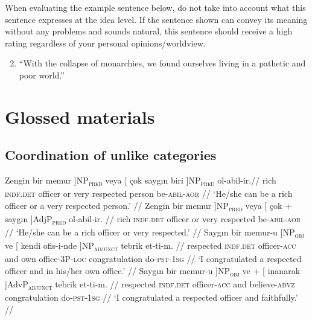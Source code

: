 When evaluating the example sentence below, do not take into account what this sentence expresses at the idea level. If the sentence shown can convey its meaning without any problems and sounds natural, this sentence should receive a high rating regardless of your personal opinions/worldview.

\begin{enumerate}
	\setcounter{enumi}{1}
	\item ``With the collapse of monarchies, we found ourselves living in a pathetic and poor world.''
\end{enumerate}


\section{Glossed materials}
\subsection{Coordination of unlike categories}

\pex[exno=TS1, glspace=!1em,everygla={},everyglb={},aboveglbskip=-.15ex, interpartskip=15pt]
\label{TS1} 
\a
\begingl
\gla {[} Zengin bir {memur }]NP\textsubscript{\textsc{pred}} veya {[} çok saygın {biri }]NP\textsubscript{\textsc{pred}} ol-abil-ir.//
\glb rich \textsc{indf.det} officer or very respected person be-\textsc{abil}-\textsc{aor} //
\glft `He/she can be a rich officer or a very respected person.' //
\endgl
\a
\begingl
\gla {[} Zengin bir {memur }]NP\textsubscript{\textsc{pred}} veya {[} çok + {saygın }]AdjP\textsubscript{\textsc{pred}} ol-abil-ir.  //
\glb rich \textsc{indf.det} officer or very respected be-\textsc{abil}-\textsc{aor} //
\glft `He/she can be a rich officer or very respected.' //
\endgl
\a
\begingl
\gla {[} Saygın bir {memur-u }]NP\textsubscript{\textsc{obj}} ve {[} kendi {ofis-i-nde }]NP\textsubscript{\textsc{adjunct}} tebrik et-ti-m.  //
\glb respected \textsc{indf.det} officer-\textsc{acc} and own office-\textsc{3P}-\textsc{loc} congratulation do-\textsc{pst}-\textsc{1sg} //
\glft `I congratulated a respected officer and in his/her own office.' //
\endgl
\a
\begingl
\gla {[} Saygın bir { memur-u }]NP\textsubscript{\textsc{obj}} ve + {[} {inanarak }]AdvP\textsubscript{\textsc{adjunct}} tebrik et-ti-m.  //
\glb respected \textsc{indf.det} officer-\textsc{acc} and believe-\textsc{advz} congratulation do-\textsc{pst}-\textsc{1sg} //
\glft `I congratulated a respected officer and faithfully.' //
\endgl
\xe 



